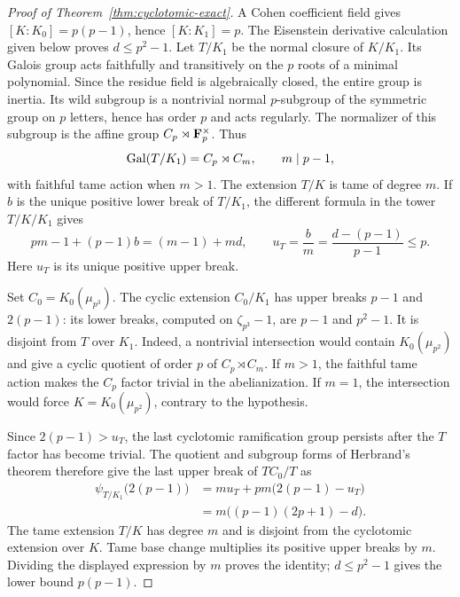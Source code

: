 \begin{proof}[Proof of Theorem~\ref{thm:cyclotomic-exact}]
A Cohen coefficient field gives $[K:K_0]=p(p-1)$, hence $[K:K_1]=p$. The Eisenstein derivative calculation given below proves $d\le p^2-1$. Let $T/K_1$ be the normal closure of $K/K_1$. Its Galois group acts faithfully and transitively on the $p$ roots of a minimal polynomial. Since the residue field is algebraically closed, the entire group is inertia. Its wild subgroup is a nontrivial normal $p$-subgroup of the symmetric group on $p$ letters, hence has order $p$ and acts regularly. The normalizer of this subgroup is the affine group $C_p\rtimes\mathbf F_p^\times$. Thus
\[
 \operatorname{Gal}(T/K_1)=C_p\rtimes C_m,\qquad m\mid p-1,
\]
with faithful tame action when $m>1$. The extension $T/K$ is tame of degree $m$. If $b$ is the unique positive lower break of $T/K_1$, the different formula in the tower $T/K/K_1$ gives
\[
 pm-1+(p-1)b=(m-1)+md,
 \qquad u_T=\frac bm=\frac{d-(p-1)}{p-1}\le p.
\]
Here $u_T$ is its unique positive upper break.

Set $C_0=K_0(\mu_{p^3})$. The cyclic extension $C_0/K_1$ has upper breaks $p-1$ and $2(p-1)$: its lower breaks, computed on $\zeta_{p^3}-1$, are $p-1$ and $p^2-1$. It is disjoint from $T$ over $K_1$. Indeed, a nontrivial intersection would contain $K_0(\mu_{p^2})$ and give a cyclic quotient of order $p$ of $C_p\rtimes C_m$. If $m>1$, the faithful tame action makes the $C_p$ factor trivial in the abelianization. If $m=1$, the intersection would force $K=K_0(\mu_{p^2})$, contrary to the hypothesis.

Since $2(p-1)>u_T$, the last cyclotomic ramification group persists after the $T$ factor has become trivial. The quotient and subgroup forms of Herbrand's theorem therefore give the last upper break of $TC_0/T$ as
\begin{align*}
 \psi_{T/K_1}\bigl(2(p-1)\bigr)
 &=m u_T+pm\bigl(2(p-1)-u_T\bigr)\\
 &=m\bigl((p-1)(2p+1)-d\bigr).
\end{align*}
The tame extension $T/K$ has degree $m$ and is disjoint from the cyclotomic extension over $K$. Tame base change multiplies its positive upper breaks by $m$. Dividing the displayed expression by $m$ proves the identity; $d\le p^2-1$ gives the lower bound $p(p-1)$.
\end{proof}


